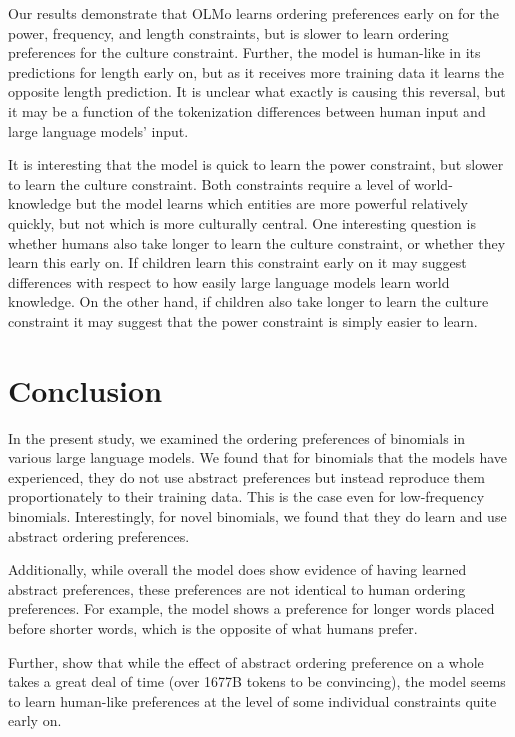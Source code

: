 \documentclass[
  12pt,
  letterpaper,
]{scrreport}
\begin{document}
Our results demonstrate that OLMo learns ordering preferences early on
for the power, frequency, and length constraints, but is slower to learn
ordering preferences for the culture constraint. Further, the model is
human-like in its predictions for length early on, but as it receives
more training data it learns the opposite length prediction. It is
unclear what exactly is causing this reversal, but it may be a function
of the tokenization differences between human input and large language
models' input.

It is interesting that the model is quick to learn the power constraint,
but slower to learn the culture constraint. Both constraints require a
level of world-knowledge but the model learns which entities are more
powerful relatively quickly, but not which is more culturally central.
One interesting question is whether humans also take longer to learn the
culture constraint, or whether they learn this early on. If children
learn this constraint early on it may suggest differences with respect
to how easily large language models learn world knowledge. On the other
hand, if children also take longer to learn the culture constraint it
may suggest that the power constraint is simply easier to learn.

\section{Conclusion}\label{conclusion-1}

In the present study, we examined the ordering preferences of binomials
in various large language models. We found that for binomials that the
models have experienced, they do not use abstract preferences but
instead reproduce them proportionately to their training data. This is
the case even for low-frequency binomials. Interestingly, for novel
binomials, we found that they do learn and use abstract ordering
preferences.

Additionally, while overall the model does show evidence of having
learned abstract preferences, these preferences are not identical to
human ordering preferences. For example, the model shows a preference
for longer words placed before shorter words, which is the opposite of
what humans prefer.

Further, show that while the effect of abstract ordering preference on a
whole takes a great deal of time (over 1677B tokens to be convincing),
the model seems to learn human-like preferences at the level of some
individual constraints quite early on.
\end{document}

